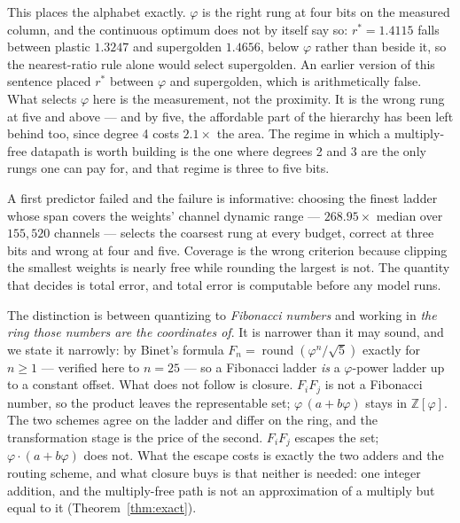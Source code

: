 \documentclass[11pt]{article}
\theoremstyle{definition}
\begin{document}
This places the alphabet exactly. $\varphi$ is the right rung at four bits on
the measured column, and the continuous optimum does not by itself say so:
$r^{*}=1.4115$ falls between plastic $1.3247$ and supergolden $1.4656$, below
$\varphi$ rather than beside it, so the nearest-ratio rule alone would select
supergolden. An earlier version of this sentence placed $r^{*}$ between
$\varphi$ and supergolden, which is arithmetically false. What selects $\varphi$
here is the measurement, not the proximity. It is the
wrong rung at five and above --- and by five, the affordable part of the
hierarchy has been left behind too, since degree 4 costs $2.1\times$ the area.
The regime in which a multiply-free datapath is worth building is the one where
degrees 2 and 3 are the only rungs one can pay for, and that regime is three to
five bits.

A first predictor failed and the failure is informative: choosing the finest
ladder whose span covers the weights' channel dynamic range --- $268.95\times$
median over $155{,}520$ channels --- selects the coarsest rung at every budget,
correct at three bits and wrong at four and five. Coverage is the wrong
criterion because clipping the smallest weights is nearly free while rounding
the largest is not. The quantity that decides is total error, and total error is
computable before any model runs.

The distinction is between quantizing to \emph{Fibonacci numbers} and working in
\emph{the ring those numbers are the coordinates of}. It is narrower than it may
sound, and we state it narrowly: by Binet's formula $F_n = \operatorname{round}
(\varphi^{n}/\sqrt5)$ exactly for $n \ge 1$ --- verified here to $n = 25$ --- so a
Fibonacci ladder \emph{is} a $\varphi$-power ladder up to a constant offset. What
does not follow is closure. $F_iF_j$ is not a Fibonacci number, so the product
leaves the representable set; $\varphi\,(a+b\varphi)$ stays in
$\mathbb{Z}[\varphi]$. The two schemes agree on the ladder and differ on the
ring, and the transformation stage is the price of the second. $F_iF_j$ escapes the set;
$\varphi\cdot(a+b\varphi)$ does not. What the escape costs is exactly the two
adders and the routing scheme, and what closure buys is that neither is needed:
one integer addition, and the multiply-free path is not an approximation of a
multiply but equal to it (Theorem~\ref{thm:exact}).
\end{document}
